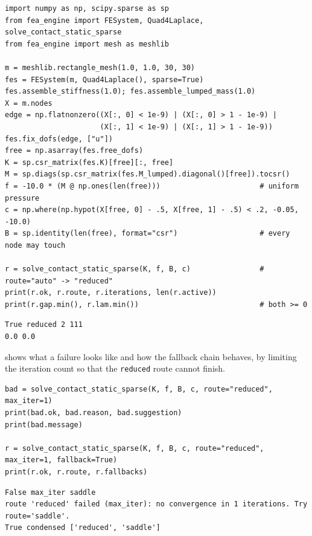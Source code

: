 \begin{lstlisting}[caption={The membrane obstacle problem with \texttt{Quad4Laplace} and the sparse contact solver.},label={lst:ct-static}]
import numpy as np, scipy.sparse as sp
from fea_engine import FESystem, Quad4Laplace, solve_contact_static_sparse
from fea_engine import mesh as meshlib

m = meshlib.rectangle_mesh(1.0, 1.0, 30, 30)
fes = FESystem(m, Quad4Laplace(), sparse=True)
fes.assemble_stiffness(1.0); fes.assemble_lumped_mass(1.0)
X = m.nodes
edge = np.flatnonzero((X[:, 0] < 1e-9) | (X[:, 0] > 1 - 1e-9) |
                      (X[:, 1] < 1e-9) | (X[:, 1] > 1 - 1e-9))
fes.fix_dofs(edge, ["u"])
free = np.asarray(fes.free_dofs)
K = sp.csr_matrix(fes.K)[free][:, free]
M = sp.diags(sp.csr_matrix(fes.M_lumped).diagonal()[free]).tocsr()
f = -10.0 * (M @ np.ones(len(free)))                       # uniform pressure
c = np.where(np.hypot(X[free, 0] - .5, X[free, 1] - .5) < .2, -0.05, -10.0)
B = sp.identity(len(free), format="csr")                   # every node may touch

r = solve_contact_static_sparse(K, f, B, c)                # route="auto" -> "reduced"
print(r.ok, r.route, r.iterations, len(r.active))
print(r.gap.min(), r.lam.min())                            # both >= 0
\end{lstlisting}

\begin{lstlisting}[numbers=none,language={},keywordstyle={},commentstyle={},frame=single,aboveskip=2pt]
True reduced 2 111
0.0 0.0
\end{lstlisting}

 shows what a failure looks like and how the fallback chain behaves, by limiting the iteration count so that the \texttt{reduced} route cannot finish.

\begin{lstlisting}[caption={A route that cannot finish reports why and what to try; fallback is opt-in.},label={lst:ct-fail}]
bad = solve_contact_static_sparse(K, f, B, c, route="reduced", max_iter=1)
print(bad.ok, bad.reason, bad.suggestion)
print(bad.message)

r = solve_contact_static_sparse(K, f, B, c, route="reduced", max_iter=1, fallback=True)
print(r.ok, r.route, r.fallbacks)
\end{lstlisting}

\begin{lstlisting}[numbers=none,language={},keywordstyle={},commentstyle={},frame=single,aboveskip=2pt]
False max_iter saddle
route 'reduced' failed (max_iter): no convergence in 1 iterations. Try route='saddle'.
True condensed ['reduced', 'saddle']
\end{lstlisting}

